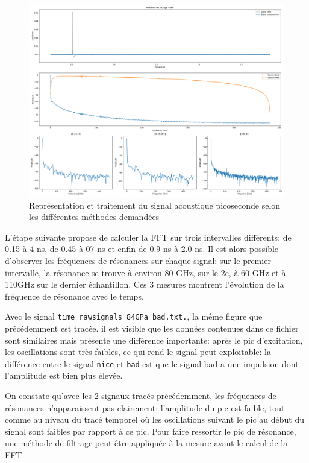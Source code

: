 \documentclass[a4paper,11pt]{article}
\begin{document}
\begin{figure}[H]
	\centering
	\includegraphics[width=\linewidth]{Figures/TDS1_bad.pdf}
	\caption{Représentation et traitement du signal acoustique picoseconde selon les différentes méthodes demandées}
	\label{fig:tds1_bad} 
\end{figure}

L'étape suivante propose de calculer la FFT sur trois intervalles différents: de 0.15 à 4 ns, de 0.45 à 07 ns et enfin de 0.9 ns à 2.0 ns. Il est alors possible d'observer les fréquences de  résonances sur chaque signal: sur le premier intervalle, la résonance se trouve à environ 80 GHz, sur le 2e, à 60 GHz et à 110GHz sur le dernier échantillon. Ces 3 mesures montrent l'évolution de la fréquence de résonance avec le temps.

Avec le signal \verb|time_rawsignals_84GPa_bad.txt.|, la même figure que précédemment est tracée. il est visible que les données contenues dans ce fichier sont similaires mais présente une différence importante: après le pic d'excitation, les oscillations sont très faibles, ce qui rend le signal peut exploitable: la différence entre le signal \verb|nice| et \verb|bad| est que le signal bad a une impulsion dont l'amplitude est bien plus élevée.

On constate qu'avec les 2 signaux tracés précédemment, les fréquences de résonances n'apparaissent pas clairement: l'amplitude du pic est faible, tout comme au niveau du tracé temporel où les oscillations suivant le pic au début du signal sont faibles par rapport à ce pic. Pour faire ressortir le pic de résonance, une méthode de filtrage peut être appliquée à la mesure avant le calcul de la FFT. 
\end{document}
